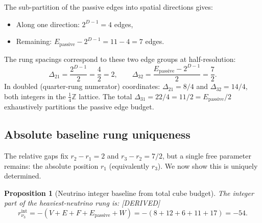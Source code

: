 \documentclass[11pt,a4paper]{article}
\newtheorem{proposition}[theorem]{Proposition}
\theoremstyle{definition}
\theoremstyle{remark}
\newcommand{\Epass}{E_{\mathrm{passive}}}
\newcommand{\DERIVED}{\textcolor{blue!70!black}{\footnotesize\textsf{[DERIVED]}}}
\begin{document}
The sub-partition of the passive edges into spatial directions gives:
\begin{itemize}[nosep]
  \item Along one direction: $2^{D-1} = 4$ edges,
  \item Remaining: $\Epass - 2^{D-1} = 11 - 4 = 7$ edges.
\end{itemize}
The rung spacings correspond to these two edge groups at half-resolution:
\begin{equation}
  \Delta_{21} = \frac{2^{D-1}}{2} = \frac{4}{2} = 2,
  \qquad
  \Delta_{32} = \frac{\Epass - 2^{D-1}}{2} = \frac{7}{2}.
  \label{eq:nu_gap_derivation}
\end{equation}
In doubled (quarter-rung numerator) coordinates: $\Delta_{21} = 8/4$ and
$\Delta_{32} = 14/4$, both integers in the $\frac{1}{4}\mathbb{Z}$ lattice.
The total $\Delta_{31} = 22/4 = 11/2 = \Epass/2$ exhaustively partitions the
passive edge budget.

\subsection{Absolute baseline rung uniqueness}

The relative gaps fix $r_2 - r_1 = 2$ and $r_3 - r_2 = 7/2$, but a single
free parameter remains: the absolute position $r_1$ (equivalently $r_3$).
We now show this is uniquely determined.

\begin{proposition}[Neutrino integer baseline from total cube budget]
\label{prop:r_nu}
The integer part of the heaviest-neutrino rung is: \DERIVED{}
\begin{equation}
  \boxed{r_{\nu_3}^{\mathrm{int}}
  = -(V + E + F + \Epass + W)
  = -(8 + 12 + 6 + 11 + 17) = -54.}
  \label{eq:r_nu3}
\end{equation}
\end{proposition}
\end{document}
